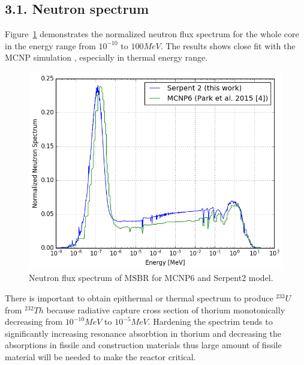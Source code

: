 \documentclass{anstrans}
\begin{document}
\subsection{3.1. Neutron spectrum}
Figure~\ref{fig:spectrum} demonstrates the normalized neutron flux spectrum for the whole core in the energy range from $10^{-10}$ to $100 MeV$. The results shows close fit with the MCNP simulation \cite{park_whole_2015}, especially in thermal energy range. 
\begin{figure}[h!] %
  \centering
  \includegraphics[width=\linewidth]{figure_3_1.png}
  \caption{Neutron flux spectrum of MSBR for MCNP6 and Serpent2 model.}
  \label{fig:spectrum}
\end{figure}
There is important to obtain epithermal or thermal spectrum to produce $^{233}U$ from $^{232}Th$ because radiative capture cross section of thorium monotonically decreasing from $10^{-10} MeV$ to $10^{-5} MeV$. Hardening the spectrim tends to significantly increasing resonance absorbtion in thorium and decreasing the absorptions in fissile and construction materials thus large amount of fissile material will be needed to make the reactor critical.
\end{document}
